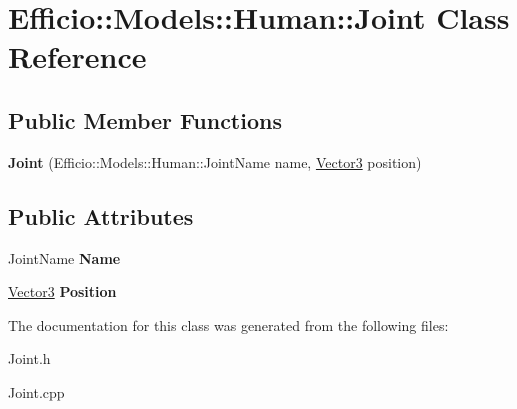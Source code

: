 \hypertarget{class_efficio_1_1_models_1_1_human_1_1_joint}{}\section{Efficio\+:\+:Models\+:\+:Human\+:\+:Joint Class Reference}
\label{class_efficio_1_1_models_1_1_human_1_1_joint}
\subsection*{Public Member Functions}
\begin{DoxyCompactItemize}
\item 
{\bfseries Joint} (Efficio\+::\+Models\+::\+Human\+::\+Joint\+Name name, \hyperlink{class_efficio_1_1_vector3}{Vector3} position)\hypertarget{class_efficio_1_1_models_1_1_human_1_1_joint_a2eab6b5945ddf7943f85a66a6d48ca6a}{}\label{class_efficio_1_1_models_1_1_human_1_1_joint_a2eab6b5945ddf7943f85a66a6d48ca6a}

\end{DoxyCompactItemize}
\subsection*{Public Attributes}
\begin{DoxyCompactItemize}
\item 
Joint\+Name {\bfseries Name}\hypertarget{class_efficio_1_1_models_1_1_human_1_1_joint_aa4fd209d1c5a00044ac4dd2648c64150}{}\label{class_efficio_1_1_models_1_1_human_1_1_joint_aa4fd209d1c5a00044ac4dd2648c64150}

\item 
\hyperlink{class_efficio_1_1_vector3}{Vector3} {\bfseries Position}\hypertarget{class_efficio_1_1_models_1_1_human_1_1_joint_a7d09e8e2be099d5400ef393ccc281ea0}{}\label{class_efficio_1_1_models_1_1_human_1_1_joint_a7d09e8e2be099d5400ef393ccc281ea0}

\end{DoxyCompactItemize}


The documentation for this class was generated from the following files\+:\begin{DoxyCompactItemize}
\item 
Joint.\+h\item 
Joint.\+cpp\end{DoxyCompactItemize}

